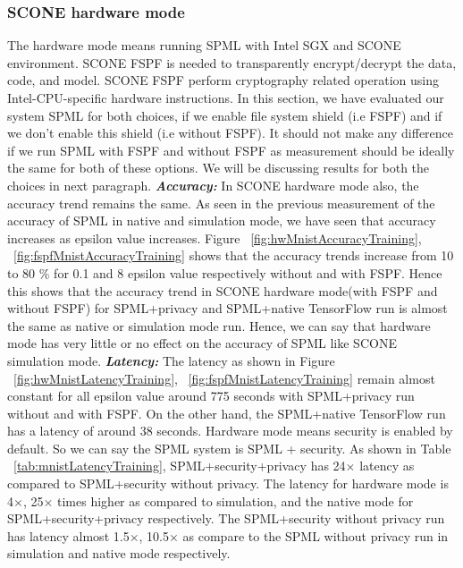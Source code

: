 \subsubsection{SCONE hardware mode}
The hardware mode means running SPML with Intel SGX and SCONE environment. SCONE FSPF \cite{77} is needed to transparently encrypt/decrypt the data, code, and model. SCONE FSPF perform cryptography related operation using Intel-CPU-specific hardware instructions. In this section, we have evaluated our system SPML for both choices, if we enable file system shield (i.e FSPF) and if we don't enable this shield (i.e without FSPF). It should not make any difference if we run SPML with FSPF and without FSPF as measurement should be ideally the same for both of these options. We will be discussing results for both the choices in next paragraph.
\newline
\newline
\textbf{\textit{Accuracy: }} In SCONE hardware mode also, the accuracy trend remains the same. As seen in the previous measurement of the accuracy of SPML in native and simulation mode, we have seen that accuracy increases as epsilon value increases. Figure ~\ref{fig:hwMnistAccuracyTraining}, ~\ref{fig:fspfMnistAccuracyTraining} shows that the accuracy trends increase from 10 to 80 \% for 0.1 and 8 epsilon value respectively without and with FSPF. Hence this shows that the accuracy trend in SCONE hardware mode(with FSPF and without FSPF) for SPML+privacy and SPML+native TensorFlow run is almost the same as native or simulation mode run. Hence, we can say that hardware mode has very little or no effect on the accuracy of SPML like SCONE simulation mode.
\newline 
\newline
\textbf{\textit{Latency: }}The latency as shown in Figure ~\ref{fig:hwMnistLatencyTraining}, ~\ref{fig:fspfMnistLatencyTraining} remain almost constant for all epsilon value around 775 seconds with SPML+privacy run without and with FSPF. On the other hand, the SPML+native TensorFlow run has a latency of around 38 seconds. Hardware mode means security is enabled by default. So we can say the SPML system is SPML + security. As shown in Table ~\ref{tab:mnistLatencyTraining}, SPML+security+privacy has 24$\times$ latency as compared to SPML+security without privacy. The latency for hardware mode is 4$\times$, 25$\times$ times higher as compared to simulation, and the native mode for SPML+security+privacy respectively. The SPML+security without privacy run has latency almost 1.5$\times$, 10.5$\times$ as compare to the SPML without privacy run in simulation and native mode respectively.

